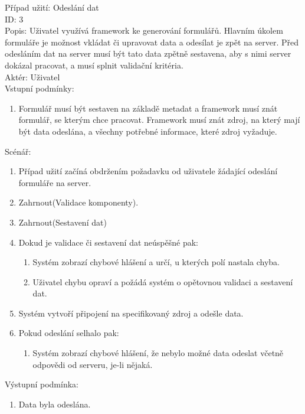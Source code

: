 Případ užití: Odeslání dat\\
ID: 3\\
Popis: 
Uživatel využívá framework ke generování formulářů. Hlavním úkolem formuláře je možnost vkládat či upravovat data a odesílat je zpět na server. Před odesláním dat na server musí být tato data zpětně sestavena, aby s nimi server dokázal pracovat, a musí splnit validační kritéria.
\\
Aktér: Uživatel\\
Vstupní podmínky:
\begin{enumerate}
\item Formulář musí být sestaven na základě metadat a framework musí znát formulář, se kterým chce pracovat. Framework musí znát zdroj, na který mají být data odeslána, a všechny potřebné informace, které zdroj vyžaduje.
\end{enumerate}
Scénář:
\begin{enumerate}
\item Případ užití začíná obdržením požadavku od uživatele žádající odeslání formuláře na server.
\item Zahrnout(Validace komponenty).
\item Zahrnout(Sestavení dat)
\item Dokud je validace či sestavení dat neúspěšné pak:
\begin{enumerate}
\item Systém zobrazí chybové hlášení a určí, u kterých polí nastala chyba.
\item Uživatel chybu opraví a požádá systém o opětovnou validaci a sestavení dat.
\end{enumerate}
\item Systém vytvoří připojení na specifikovaný zdroj a odešle data.
\item Pokud odeslání selhalo pak:
\begin{enumerate}
\item Systém zobrazí chybové hlášení, že nebylo možné data odeslat včetně odpovědi od serveru, je-li nějaká.
\end{enumerate}
\end{enumerate}

Výstupní podmínka:
\begin{enumerate}
\item Data byla odeslána.
\end{enumerate}


